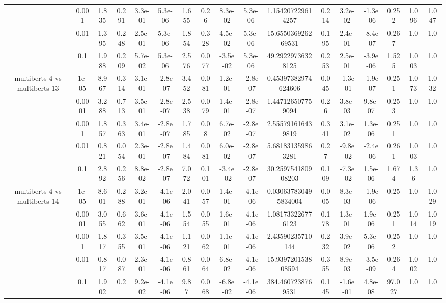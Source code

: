 \begin{tabular}{|c|c|c|c|c|c|c|c|c|c|c|c|c|c|c|c|c|}
 & 0.001 & 1.835 & 0.291 & 3.3e-01 & 5.3e-06 & 1.655 & 0.26 & 8.3e-02 & 5.3e-06 & 1.154207229614257 & 0.214 & 3.2e-02 & -1.3e-06 & 0.252 & 1.096 & 1.047 \\
 & 0.01 & 1.395 & 0.248 & 2.5e-01 & 5.3e-06 & 1.854 & 0.328 & 4.5e-02 & 5.3e-06 & 15.655036926269531 & 0.195 & 2.4e-01 & -8.4e-07 & 0.267 & 1.0 & 1.0 \\
 & 0.1 & 1.988 & 0.209 & 5.7e-02 & 5.3e-06 & 2.576 & 0.077 & -3.5e-02 & 5.3e-06 & 49.29229736328125 & 0.253 & 2.5e-01 & -3.9e-06 & 1.525 & 1.003 & 1.0 \\
\hline
\multirow{5}{*}{multiberts 4 vs multiberts 13} & 1e-05 & 8.967 & 0.314 & 3.1e-01 & -2.8e-07 & 3.452 & 0.081 & 1.2e-01 & -2.8e-07 & 0.45397382974624606 & 0.045 & -1.3e-01 & -1.9e-07 & 0.251 & 1.073 & 1.032 \\
 & 0.0001 & 3.288 & 0.713 & 3.5e-01 & -2.8e-07 & 2.538 & 0.079 & 1.4e-01 & -2.8e-07 & 1.447126507759094 & 0.26 & 3.8e-03 & 9.8e-07 & 0.253 & 1.0 & 1.0 \\
 & 0.001 & 1.857 & 0.363 & 3.4e-01 & -2.8e-07 & 1.785 & 0.08 & 6.7e-02 & -2.8e-07 & 2.555791616439819 & 0.341 & 3.1e-02 & 1.3e-06 & 0.251 & 1.0 & 1.0 \\
 & 0.01 & 0.821 & 0.054 & 2.3e-01 & -2.8e-07 & 1.484 & 0.081 & 6.0e-02 & -2.8e-07 & 5.681831359863281 & 0.27 & -9.8e-02 & -2.4e-06 & 0.261 & 1.003 & 1.0 \\
 & 0.1 & 2.892 & 0.256 & 8.8e-02 & -2.8e-07 & 7.072 & 0.101 & -3.4e-02 & -2.8e-07 & 30.259754180908203 & 0.109 & -7.3e-02 & 1.5e-06 & 1.674 & 1.36 & 1.0 \\
\hline
\multirow{5}{*}{multiberts 4 vs multiberts 14} & 1e-05 & 8.601 & 0.288 & 3.2e-01 & -4.1e-06 & 2.041 & 0.057 & 1.4e-01 & -4.1e-06 & 0.030637830495834004 & 0.005 & 8.3e-03 & -1.9e-06 & 0.25 & 1.0 & 1.029 \\
 & 0.0001 & 3.055 & 0.662 & 3.6e-01 & -4.1e-06 & 1.554 & 0.055 & 1.6e-01 & -4.1e-06 & 1.081733226776123 & 0.178 & 1.3e-01 & 1.9e-06 & 0.251 & 1.014 & 1.019 \\
 & 0.001 & 1.817 & 0.355 & 3.5e-01 & -4.1e-06 & 1.121 & 0.062 & 1.1e-01 & -4.1e-06 & 2.43590235710144 & 0.232 & 3.9e-02 & 5.3e-06 & 0.252 & 1.0 & 1.0 \\
 & 0.01 & 0.817 & 0.087 & 2.3e-01 & -4.1e-06 & 0.861 & 0.064 & 6.8e-02 & -4.1e-06 & 15.939720153808594 & 0.355 & 8.9e-03 & -3.5e-09 & 0.264 & 1.002 & 1.0 \\
 & 0.1 & 1.902 & 0.2 & 9.2e-02 & -4.1e-06 & 9.87 & 0.068 & -6.8e-02 & -4.1e-06 & 384.4607238769531 & 0.145 & -1.6e-01 & 4.8e-08 & 97.027 & 1.0 & 1.0 \\

\end{tabular}
